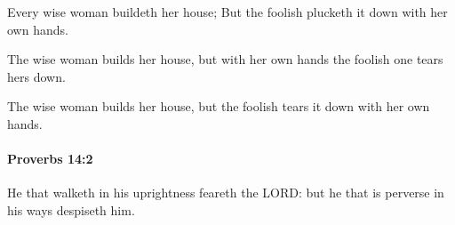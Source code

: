 			\begin{versebox}
					\item[BHS] 
					\item[ASV] Every wise woman buildeth her house; But the foolish plucketh it down with her own hands.
					\item[NIV] The wise woman builds her house, but with her own hands the foolish one tears hers down.
					\item[NRSV] The wise woman builds her house, but the foolish tears it down with her own hands.
			\end{versebox}

		\paragraph{Proverbs 14:2} %
			\label{PROVERBS-14-2}

			He that walketh in his uprightness feareth the LORD: but he that is perverse in his ways despiseth him.

